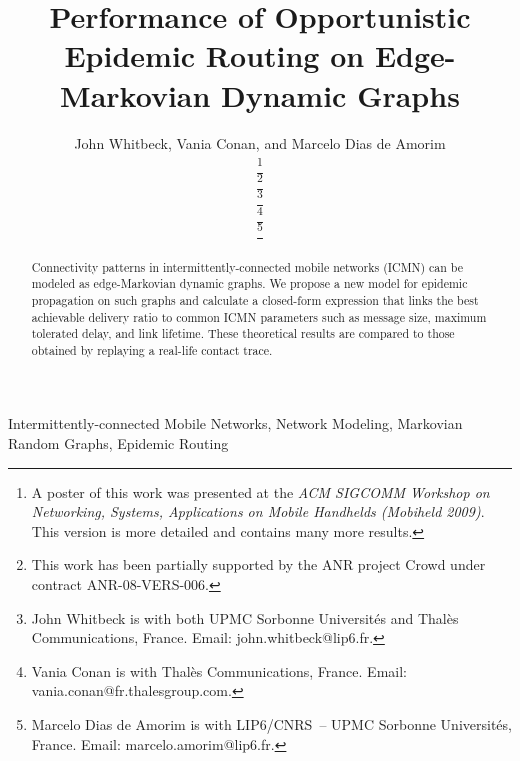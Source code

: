 \documentclass[final,journal,letterpaper]{IEEEtran}
\begin{document}
\title{Performance of Opportunistic Epidemic Routing on Edge-Markovian Dynamic Graphs}

\author{John Whitbeck, Vania Conan, and Marcelo Dias de Amorim

\thanks{A poster of this work was presented at the \emph{ACM SIGCOMM Workshop on Networking, Systems, Applications on Mobile Handhelds (Mobiheld 2009)}. This version is more detailed and contains many more results.}

\thanks{This work has been partially supported by the ANR project Crowd under contract ANR-08-VERS-006.}

\thanks{John Whitbeck is with both UPMC Sorbonne Universit{\'e}s and Thal{\`e}s Communications, France. Email: john.whitbeck@lip6.fr. }

\thanks{Vania Conan is with Thal{\`e}s Communications, France. Email: vania.conan@fr.thalesgroup.com.}

\thanks{Marcelo Dias de Amorim is with LIP6/CNRS~-- UPMC Sorbonne Universit{\'e}s, France. Email: marcelo.amorim@lip6.fr.}}



\maketitle

\begin{abstract}
Connectivity patterns in intermittently-connected mobile networks (ICMN) can be modeled as edge-Markovian dynamic graphs. We propose a new model for epidemic propagation on such graphs and calculate a closed-form expression that links the best achievable delivery ratio to common ICMN parameters such as message size, maximum tolerated delay, and link lifetime. These theoretical results are compared to those obtained by replaying a real-life contact trace.
\end{abstract}

\begin{IEEEkeywords}
Intermittently-connected Mobile Networks, Network Modeling, Markovian Random Graphs, Epidemic Routing
\end{IEEEkeywords}


\IEEEdisplaynotcompsoctitleabstractindextext
\IEEEpeerreviewmaketitle
\end{document}
